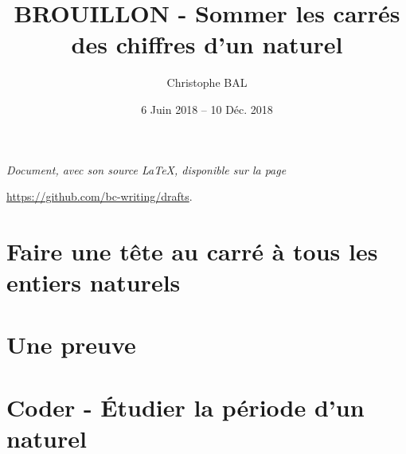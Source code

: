 \documentclass[12pt]{amsart}
\begin{document}
\title{BROUILLON - Sommer les carrés des chiffres d'un naturel}
\author{Christophe BAL}
\date{6 Juin 2018 -- 10 Déc. 2018}

\maketitle

\begin{center}
	\itshape
	Document, avec son source \LaTeX, disponible sur la page
	
	\url{https://github.com/bc-writing/drafts}.
\end{center}



\setcounter{tocdepth}{1}
\tableofcontents



\section{Faire une tête au carré à tous les entiers naturels}




\section{Une preuve}\label{proof}




\section{Coder - Étudier la \og période \fg{} d'un naturel}



%
%
%
\end{document}
